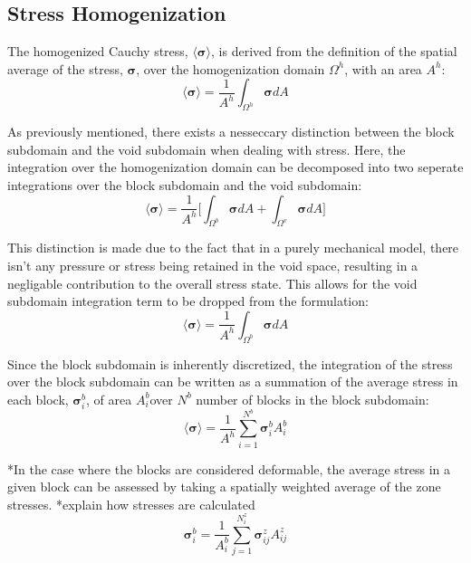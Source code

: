 \subsection{Stress Homogenization}
The homogenized Cauchy stress, $\langle \boldsymbol{\sigma} \rangle$, is derived from the definition of the spatial average of the stress, $\boldsymbol{\sigma}$, over the homogenization domain $\Omega^h$, with an area $A^h$:
\begin{equation}
\label{eqn:stress1}
\langle \boldsymbol{\sigma} \rangle = \frac{1}{A^h} \int_{\Omega^h} \boldsymbol{\sigma} {dA}
\end{equation}

As previously mentioned, there exists a nesseccary distinction between the block subdomain and the void subdomain when dealing with stress. Here, the integration over the homogenization domain can be decomposed into two seperate integrations over the block subdomain and the void subdomain:
\begin{equation}
\label{eqn:stress2}
\langle \boldsymbol{\sigma} \rangle = 
\frac{1}{A^h} \bigg \lbrack {\int_{\Omega^{b}} \boldsymbol{\sigma} {dA} + 
\int_{\Omega^{v}} \boldsymbol{\sigma} {dA}} \bigg \rbrack
\end{equation}

This distinction is made due to the fact that in a purely mechanical model, there isn't any pressure or stress being retained in the void space, resulting in a negligable contribution to the overall stress state. This allows for the void subdomain integration term to be dropped from the formulation:
\begin{equation}
\label{eqn:stress2a}
\langle \boldsymbol{\sigma} \rangle = 
\frac{1}{A^h} \int_{\Omega^{b}} \boldsymbol{\sigma} {dA}
\end{equation}

Since the block subdomain is inherently discretized, the integration of the stress over the block subdomain can be written as a summation of the average stress in each block, $\boldsymbol{\sigma}^b_i$, of area $A^b_i$over $N^b$ number of blocks in the block subdomain:
\begin{equation}
\label{eqn:stress3}
\langle \boldsymbol{\sigma} \rangle = 
\frac{1}{A^h} \sum_{i=1}^{N^{b}} \boldsymbol{\sigma}_{i}^b A^{b}_{i} 
\end{equation}

*In the case where the blocks are considered deformable, the average stress in a given block can be assessed by taking a spatially weighted average of the zone stresses. *explain how stresses are calculated
\begin{equation}
\label{eqn:stress3a}
\boldsymbol{\sigma}_{i}^b = 
\frac{1}{A^b_i} \sum_{j=1}^{N^{z}_i} \boldsymbol{\sigma}^z_{ij} A^{z}_{ij} 
\end{equation}

